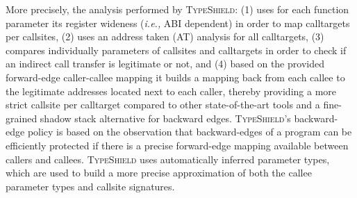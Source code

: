 More precisely, the analysis performed by \textsc{TypeShield}:
(1) uses for each function parameter its register wideness (\textit{i.e.,} ABI dependent) in order to map calltargets per callsites,  
(2) uses an address taken (AT) analysis for all calltargets, 
(3) compares individually parameters of callsites and calltargets in order to check if an indirect call transfer is legitimate or not, and
(4) based on the provided forward-edge caller-callee mapping it builds a mapping back from each callee to the legitimate addresses located next to each caller,
thereby providing a more strict callsite per calltarget compared to other state-of-the-art tools and a fine-grained shadow stack alternative for backward edges.
\textsc{TypeShield}'s backward-edge policy is based on the observation that backward-edges of a program can be efficiently protected
if there is a precise forward-edge mapping available between callers and callees.
\textsc{TypeShield} uses automatically inferred parameter types, which are used to build a more precise approximation of both the callee parameter types and callsite signatures. 

